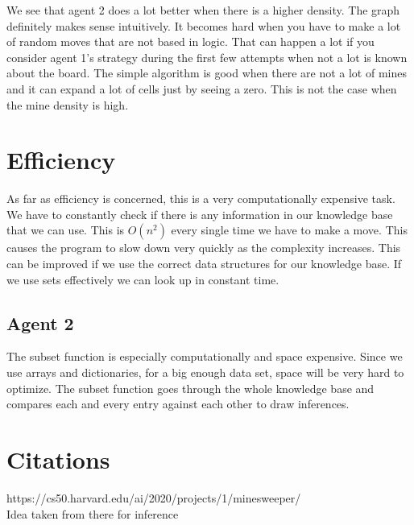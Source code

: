 \documentclass[11pt]{scrartcl} %
\begin{document}
We see that agent 2 does a lot better when there is a higher density. The graph definitely makes sense intuitively. It becomes hard when you have to make a lot of random moves that are not based in logic. That can happen a lot if you consider agent 1's strategy during the first few attempts when not a lot is known about the board. The simple algorithm is good when there are not a lot of mines and it can expand a lot of cells just by seeing a zero. This is not the case when the mine density is high. 

\section{Efficiency}
As far as efficiency is concerned, this is a very computationally expensive task. We have to constantly check if there is any information in our knowledge base that we can use. This is $O(n^2)$ every single time we have to make a move. This causes the program to slow down very quickly as the complexity increases. This can be improved if we use the correct data structures for our knowledge base. If we use sets effectively we can look up in constant time. 
\subsection{Agent 2}
The subset function is especially computationally and space expensive. Since we use arrays and dictionaries, for a big enough data set, space will be very hard to optimize. The subset function goes through the whole knowledge base and compares each and every entry against each other to draw inferences. 

\section{Citations}
https://cs50.harvard.edu/ai/2020/projects/1/minesweeper/\\
Idea taken from there for inference
\end{document}
